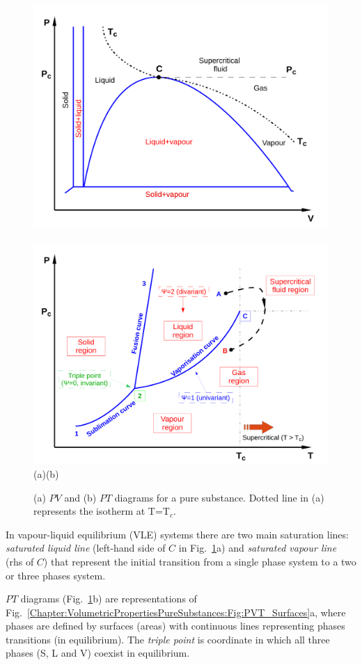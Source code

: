           \begin{figure}[h]
              \vbox{
                    \hbox{\includegraphics[width=.5\columnwidth,clip]{./Figs/PV_Diagram1}
                          \includegraphics[width=.5\columnwidth,clip]{./Figs/PT_Diagram}}
                    \vspace{-.1cm}
                    \hbox{\hspace{4cm}(a)\hspace{8cm}(b)}}
              \caption{ (a) $PV$ and (b) $PT$ diagrams for a pure substance. Dotted line in (a) represents the isotherm at T=T$_{c}$.}\label{Chapter:VolumetricPropertiesPureSubstances:Fig:PV-PT_Diagrams}
           \end{figure}


           In vapour-liquid equilibrium (VLE) systems there are two main saturation lines: {\it saturated liquid line} (left-hand side of $C$ in Fig.~\ref{Chapter:VolumetricPropertiesPureSubstances:Fig:PV-PT_Diagrams}a)  and {\it saturated vapour line} (rhs of $C$) that represent the initial transition from a single phase system to a two or three phases system. 
%

$PT$ diagrams (Fig.~\ref{Chapter:VolumetricPropertiesPureSubstances:Fig:PV-PT_Diagrams}b) are representations of Fig.~\ref{Chapter:VolumetricPropertiesPureSubstances:Fig:PVT_Surfaces}a, where phases are defined by surfaces (\ie areas) with continuous lines representing phases transitions (\ie in equilibrium). The {\it triple point} is coordinate in which all three phases (S, L and V) coexist in equilibrium.

